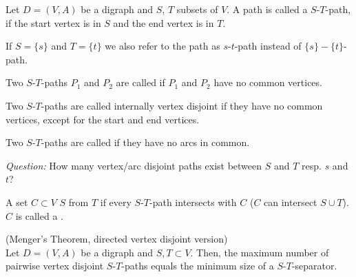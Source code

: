 \begin{lec}[2011-12-01]\end{lec}



\begin{defn}
Let $D = (V, A)$ be a digraph and $S$, $T$ subsets of $V$.
A path is called a $S$-$T$-path, if the start vertex is in $S$ and the end
vertex is in $T$.

If $S = \{s\}$ and $T = \{t\}$ we also refer to the path as $s$-$t$-path
instead of $\{s\}-\{t\}$-path.
\end{defn}

\begin{defn}
Two $S$-$T$-paths $P_1$ and $P_2$ are called
 if $P_1$ and $P_2$ have no common
vertices.

Two $S$-$T$-paths are called internally vertex disjoint if they have no common
vertices, except for the start and end vertices.

Two $S$-$T$-paths are called  if they have no
arcs in common.
\end{defn}
\emph{Question:} How many vertex/arc disjoint paths exist between $S$ and
$T$ resp. $s$ and $t$?

\begin{defn} 
A set $C \subset V$  $S$ from $T$ if every
$S$-$T$-path intersects with $C$ ($C$ can intersect $S \cup T$). $C$ is called
a . 
\end{defn}

\begin{thm}(Menger's Theorem, directed vertex disjoint version)\\
Let $D=(V,A)$ be a digraph and $S,T \subset V$. Then, the maximum number of
pairwise vertex disjoint $S$-$T$-paths equals the minimum size of a
$S$-$T$-separator.
\end{thm}

